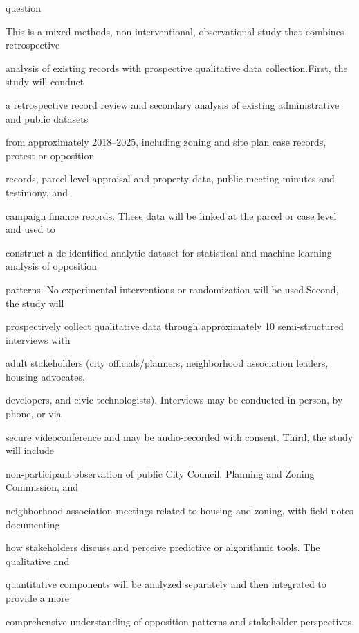 \documentclass[10pt, letterpaper]{article}
\begin{document}
question

\begin{responsebox}

This is a mixed-methods, non-interventional, observational study that combines retrospective

\end{responsebox}

analysis of existing records with prospective qualitative data collection.First, the study will conduct

a retrospective record review and secondary analysis of existing administrative and public datasets

from approximately 2018–2025, including zoning and site plan case records, protest or opposition

records, parcel-level appraisal and property data, public meeting minutes and testimony, and

campaign finance records. These data will be linked at the parcel or case level and used to

construct a de-identified analytic dataset for statistical and machine learning analysis of opposition

patterns. No experimental interventions or randomization will be used.Second, the study will

prospectively collect qualitative data through approximately 10 semi-structured interviews with

adult stakeholders (city officials/planners, neighborhood association leaders, housing advocates,

\vspace{0.5em}

developers, and civic technologists). Interviews may be conducted in person, by phone, or via

secure videoconference and may be audio-recorded with consent. Third, the study will include

non-participant observation of public City Council, Planning and Zoning Commission, and

neighborhood association meetings related to housing and zoning, with field notes documenting

how stakeholders discuss and perceive predictive or algorithmic tools. The qualitative and

quantitative components will be analyzed separately and then integrated to provide a more

comprehensive understanding of opposition patterns and stakeholder perspectives.
\end{document}
